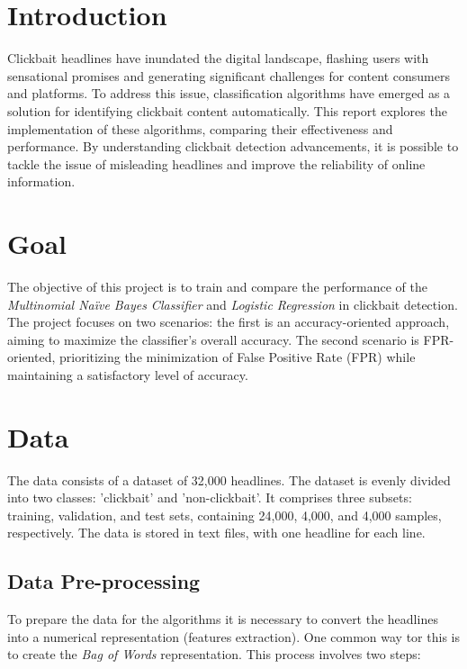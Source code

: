 \documentclass{article}
\begin{document}
\begin{multicols}{2}
    
\section{Introduction}
Clickbait headlines have inundated the digital landscape, flashing users with sensational promises and generating significant challenges 
for content consumers and platforms. To address this issue, classification algorithms have emerged as a solution for identifying clickbait 
content automatically. This report explores the implementation of these algorithms, comparing their effectiveness and performance. 
By understanding clickbait detection advancements, it is possible to tackle the issue of misleading headlines and improve the reliability of online information.


\section{Goal}
The objective of this project is to train and compare the performance of the \textit{Multinomial Naïve Bayes Classifier} and \textit{Logistic Regression} 
in clickbait detection. The project focuses on two scenarios: the first is an accuracy-oriented approach, aiming to maximize the classifier's overall accuracy. 
The second scenario is FPR-oriented, prioritizing the minimization of False Positive Rate (FPR) while maintaining a satisfactory level of accuracy.


\section{Data}
The data consists of a dataset of 32,000 headlines. The dataset is evenly divided into two classes: 'clickbait' and 'non-clickbait'. 
It comprises three subsets: training, validation, and test sets, containing 24,000, 4,000, and 4,000 samples, respectively.
The data is stored in text files, with one headline for each line.

\subsection{Data Pre-processing}
To prepare the data for the algorithms it is necessary to convert the headlines into a numerical representation (features extraction). 
One common way tor this is to create the \textit{Bag of Words} representation. This process involves two steps:


\end{multicols}
\end{document}
